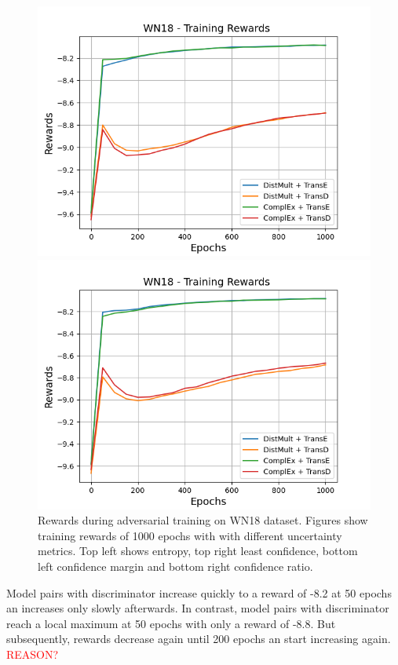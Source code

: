 \begin{figure}
\begin{minipage}{.5\textwidth}
      \centering
      \includegraphics[width=0.9\linewidth]{figures/results/gan_train/not_pretrained/uncertainty/max_distribution/confidence_margin/wn18/uncertainty_wn18_rew.png}
    \end{minipage}%
    \begin{minipage}{.5\textwidth}
      \centering
      \includegraphics[width=0.9\linewidth]{figures/results/gan_train/not_pretrained/uncertainty/max_distribution/confidence_ratio/wn18/uncertainty_wn18_rew.png}
    \end{minipage}%
    \caption{Rewards during adversarial training on \textsc{WN18} dataset. 
    Figures show training rewards of 1000 epochs with \ussoftmax with different uncertainty metrics.
    Top left shows entropy, top right least confidence, 
    bottom left confidence margin and bottom right confidence ratio.}
    \label{fig:advtrain_metrics_wn18}
\end{figure}
Model pairs with \transe discriminator increase quickly to a reward of -8.2 at 50 epochs an increases only slowly afterwards.
In contrast, model pairs with \transd discriminator reach a local maximum at 50 epochs with only a reward of -8.8.
But subsequently, rewards decrease again until 200 epochs an start increasing again.
\textcolor{red}{REASON?}